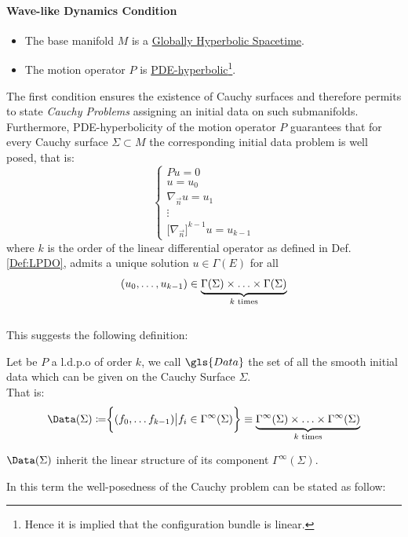 \documentclass[Main]{subfiles}
\begin{document}
		\paragraph{Wave-like %
			Dynamics Condition}
		\begin{itemize}
			 \item The base manifold $M$ is a \underline{Globally Hyperbolic Spacetime}.
			 \item The motion operator $P$ is \underline{PDE-hyperbolic}\footnote{Hence it is implied that the configuration bundle is linear.}.
		\end{itemize}
		The first condition ensures the existence of Cauchy surfaces and therefore permits to state  \emph{Cauchy Problems} assigning an initial data on such submanifolds.
		Furthermore, PDE-hyperbolicity of the motion operator $P$ guarantees that for every Cauchy surface $\Sigma \subset M$ the corresponding initial data problem is well posed, that is:
			\begin{equation}\label{CauchyProblem}
				\begin{cases} P u = 0 \\ u = u_0 \\ \nabla_{\vec{n}}u= u_1 \\  \vdots \\ \big[\nabla_{\vec{n}} \big]^{k-1}u = u_{k-1}\end{cases}
			\end{equation}
			where $k$ is the order of the linear differential operator as defined in Def. \ref{Def:LPDO},
			admits a unique solution $u\in \Gamma(E)$ for all 
			\begin{displaymath}
				(u_0,\ldots, u_{k-1}) \in \underbrace{\Gamma (\Sigma )\times \ldots \times \Gamma (\Sigma )}_{\footnotesize{ k \textrm{ times}}}
			\end{displaymath}
			\\
			This suggests the following definition:
			\begin{definition}
				Let be  $P$ a l.d.p.o of order $k$, we call $\gls{Data}$ the set of all the smooth initial data which can be given on the Cauchy Surface $\Sigma$.\\That is:
				\begin{displaymath}
					\Data(\Sigma)  \coloneqq \biggr \{ (f_0,\ldots f_{k-1}) \big \vert f_i \in \Gamma^\infty(\Sigma)\biggr\}  \equiv
					\underbrace{\Gamma^\infty (\Sigma )\times \ldots \times \Gamma^\infty (\Sigma )}_{\footnotesize{ k \textrm{ times}}}					
				\end{displaymath}
			\end{definition}
			\begin{remark}
				$\Data(\Sigma)$ inherit the linear structure of its component $ \Gamma^\infty(\Sigma)$.
			\end{remark}	
			In this term the well-posedness of the Cauchy problem can be stated as follow:
\end{document}
